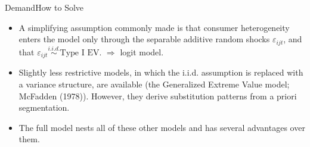 \documentclass{beamer}
\begin{document}
\begin{frame}{Demand}{How to Solve}
	\begin{itemize}
		\item A simplifying assumption commonly made is that consumer heterogeneity enters the model only through the separable additive random shocks $\varepsilon_{ijt}$, and that $\varepsilon_{ijt}\overset{i.i.d.}{\sim} \mbox{Type I EV}$. $\Rightarrow$ logit model.
		\item Slightly less restrictive models, in which the i.i.d. assumption is replaced with a variance structure, are available (the Generalized Extreme Value model; McFadden (1978)). However, they derive substitution patterns from a priori segmentation.
		\item The full model nests all of these other models and has several advantages over them.
	\end{itemize}
	
\end{frame}

\end{document}
